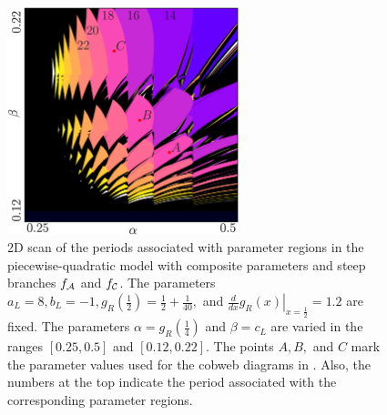 \begin{figure}
	\centering
	\includegraphics[width=0.6\textwidth]{../Figures/5/5.9/result.png}
	\caption[2D scan of the periods associated with the parameter regions in the piecewise-quadratic model with composite parameters and steep branches]{
	2D scan of the periods associated with parameter regions in the piecewise-quadratic model with composite parameters and steep branches $f_{\mathcal{A}}$ and $f_{\mathcal{C}}$.
	The parameters $a_L = 8, b_L = -1, g_R\left(\frac{1}{2}\right) = \frac{1}{2} + \frac{1}{40},$ and $\left. \frac{d}{dx} g_R\left(x\right) \right|_{x = \frac{1}{2}} = 1.2$ are fixed.
	The parameters $\alpha = g_R\left(\frac{1}{4}\right)$ and $\beta = c_L$ are varied in the ranges $[0.25, 0.5]$ and $[0.12, 0.22]$.
	The points $A, B,$ and $C$ mark the parameter values used for the cobweb diagrams in .
	Also, the numbers at the top indicate the period associated with the corresponding parameter regions.
	}
	\label{fig:setup.quad.hyper.1.period}
\end{figure}

